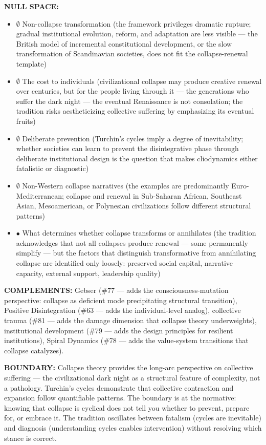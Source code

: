 \textbf{NULL SPACE:}

\begin{itemize}[nosep,leftmargin=*]
  \item $\emptyset$ Non-collapse transformation (the framework privileges dramatic rupture; gradual institutional evolution, reform, and adaptation are less visible — the British model of incremental constitutional development, or the slow transformation of Scandinavian societies, does not fit the collapse-renewal template)
  \item $\emptyset$ The cost to individuals (civilizational collapse may produce creative renewal over centuries, but for the people living through it — the generations who suffer the dark night — the eventual Renaissance is not consolation; the tradition risks aestheticizing collective suffering by emphasizing its eventual fruits)
  \item $\emptyset$ Deliberate prevention (Turchin's cycles imply a degree of inevitability; whether societies can learn to prevent the disintegrative phase through deliberate institutional design is the question that makes cliodynamics either fatalistic or diagnostic)
  \item $\emptyset$ Non-Western collapse narratives (the examples are predominantly Euro-Mediterranean; collapse and renewal in Sub-Saharan African, Southeast Asian, Mesoamerican, or Polynesian civilizations follow different structural patterns)
  \item $\bullet$ What determines whether collapse transforms or annihilates (the tradition acknowledges that not all collapses produce renewal — some permanently simplify — but the factors that distinguish transformative from annihilating collapse are identified only loosely: preserved social capital, narrative capacity, external support, leadership quality)
\end{itemize}


\textbf{COMPLEMENTS:} Gebser (\#77 — adds the consciousness-mutation perspective: collapse as deficient mode precipitating structural transition), Positive Disintegration (\#63 — adds the individual-level analog), collective trauma (\#81 — adds the damage dimension that collapse theory underweights), institutional development (\#79 — adds the design principles for resilient institutions), Spiral Dynamics (\#78 — adds the value-system transitions that collapse catalyzes).


\textbf{BOUNDARY:} Collapse theory provides the long-arc perspective on collective suffering — the civilizational dark night as a structural feature of complexity, not a pathology. Turchin's cycles demonstrate that collective contraction and expansion follow quantifiable patterns. The boundary is at the normative: knowing that collapse is cyclical does not tell you whether to prevent, prepare for, or embrace it. The tradition oscillates between fatalism (cycles are inevitable) and diagnosis (understanding cycles enables intervention) without resolving which stance is correct.


